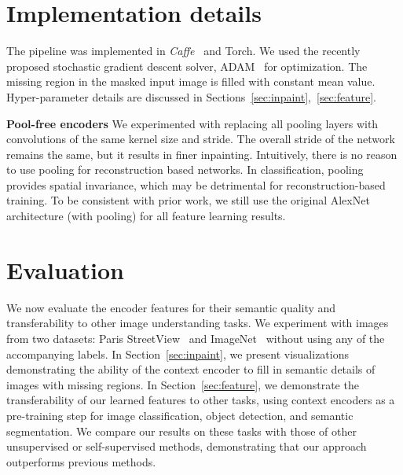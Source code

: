 \documentclass[10pt,twocolumn,letterpaper]{article}
\begin{document}
\section{Implementation details}
The pipeline was implemented in \textit{Caffe}~\cite{caffe} and Torch.
We used the recently proposed stochastic gradient descent solver, ADAM~\cite{kingma2014adam} for optimization.
The missing region in the masked input image is filled with constant mean value.
Hyper-parameter details are discussed in Sections~\ref{sec:inpaint},~\ref{sec:feature}.

{\bf Pool-free encoders}
We experimented with replacing all pooling layers with convolutions of the same kernel size and stride.
The overall stride of the network remains the same, but it results in finer inpainting.
Intuitively, there is no reason to use pooling for reconstruction based networks.
In classification, pooling provides spatial invariance, which may be detrimental for reconstruction-based training.
To be consistent with prior work, we still use the original AlexNet architecture (with pooling) for all feature learning results.



\section{Evaluation}
We now evaluate the encoder features for their semantic quality and transferability to other image understanding tasks.
We experiment with images from two datasets: Paris StreetView~\cite{doersch2012makes} and ImageNet~\cite{imagenet} without using any of the accompanying labels.
In Section~\ref{sec:inpaint}, we present visualizations demonstrating the ability of the context encoder to fill in semantic details of images with missing regions.
In Section~\ref{sec:feature}, we demonstrate the transferability of our learned features to other tasks, using context encoders as a pre-training step for image classification, object detection, and semantic segmentation.
We compare our results on these tasks with those of other unsupervised or self-supervised methods, demonstrating that our approach outperforms previous methods.
\end{document}
